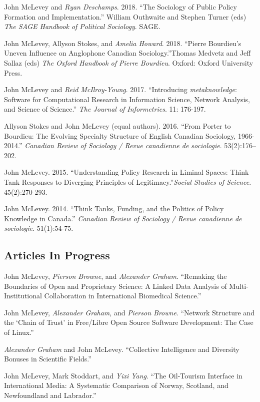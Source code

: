\ind John McLevey and \emph{Ryan Deschamps}. 2018. ``The Sociology of Public Policy Formation and Implementation.'' William Outhwaite and Stephen Turner (eds) \emph{The SAGE Handbook of Political Sociology}. SAGE.

\ind John McLevey, Allyson Stokes, and \emph{Amelia Howard}. 2018. ``Pierre Bourdieu's Uneven Influence on Anglophone Canadian Sociology.''Thomas Medvetz and Jeff Sallaz (eds) \emph{The Oxford Handbook of Pierre Bourdieu}. Oxford: Oxford University Press.

\ind John McLevey and \emph{Reid McIlroy-Young}. 2017. ``Introducing \emph{metaknowledge}: Software for Computational Research in Information Science, Network Analysis, and Science of Science.'' \emph{The Journal of Informetrics}. 11: 176-197.


\ind Allyson Stokes and John McLevey (equal authors). 2016. ``From Porter to Bourdieu: The Evolving Specialty Structure of English Canadian Sociology, 1966- 2014.'' \emph{Canadian Review of Sociology / Revue canadienne de sociologie}. 53(2):176--202.

\ind John McLevey. 2015. ``Understanding Policy Research in Liminal Spaces: Think Tank Responses to Diverging Principles of Legitimacy.''\emph{Social Studies of Science}. 45(2):270-293.

\ind John McLevey. 2014. ``Think Tanks, Funding, and the Politics of Policy Knowledge in Canada.'' \emph{Canadian Review of Sociology / Revue canadienne de sociologie}. 51(1):54-75.

\subsection{Articles In Progress}\label{articles-in-progress}

\ind John McLevey, \emph{Pierson Browne}, and \emph{Alexander Graham}.
``Remaking the Boundaries of Open and Proprietary Science: A Linked Data
Analysis of Multi-Institutional Collaboration in International
Biomedical Science.''

\ind John McLevey, \emph{Alexander Graham}, and \emph{Pierson Browne}.
``Network Structure and the `Chain of Trust' in Free/Libre Open Source
Software Development: The Case of Linux.''

\ind \emph{Alexander Graham} and John McLevey. ``Collective Intelligence
and Diversity Bonuses in Scientific Fields.''

\ind John McLevey, Mark Stoddart, and \emph{Yixi Yang}. ``The
Oil-Tourism Interface in International Media: A Systematic Comparison of
Norway, Scotland, and Newfoundland and Labrador.''

